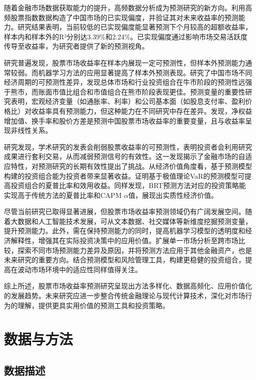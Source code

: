 \documentclass[12pt, a4paper]{article}
\begin{document}
随着金融市场数据获取能力的提升，高频数据分析成为预测研究的新方向。\citet{chen2018}利用高频股票指数数据构造了中国市场的已实现偏度，并验证其对未来收益率的预测能力。研究结果表明，当前较低的已实现偏度能显著预测下个月较高的超额收益率，样本内和样本外的R²分别达3.39\%和2.24\%。已实现偏度通过影响市场交易活跃度传导至收益率，为研究者提供了新的预测视角。

研究普遍发现，股票市场收益率在样本内展现一定可预测性，但样本外预测能力通常较弱。而机器学习方法的应用显著提高了样本外预测表现。\citet{jiang2019}研究了中国市场不同经济周期的可预测性差异，发现总体市场和行业投资组合在牛市阶段的预测性远强于熊市，而账面市值比组合和市值组合在熊市阶段表现更佳。预测变量的重要性研究表明，宏观经济变量（如通胀率、利率）和公司基本面（如股息支付率、盈利价格比）对收益率具有预测能力，但这种能力在不同研究中存在差异。\citet{li2023}发现，净权益增加值、换手率和股价方差是预测中国股票市场收益率的重要变量，且与收益率呈现非线性关系。

\citet{mclean2016}研究发现，学术研究的发表会削弱股票收益率的可预测性，表明投资者会利用研究成果进行套利交易，从而减弱预测信号的有效性。这一发现揭示了金融市场的自适应特性，对预测研究的长期有效性提出了挑战。从经济价值角度看，基于预测模型构建的投资组合能为投资者带来显著收益。\citet{chen2014}证明基于极值理论VaR的预测模型可提高投资组合的夏普比率和效用收益。\citet{li2023}同样发现，BRT预测方法对应的投资策略能实现高于传统方法的夏普比率和CAPM $\alpha $值，展现出实质性经济价值。

尽管当前研究已取得显著进展，但股票市场收益率预测领域仍有广阔发展空间。随着大数据和人工智能技术发展，可从文本数据、社交媒体等新维度挖掘预测变量，提升预测能力。此外，需在保持预测能力的同时，提高机器学习模型的透明度和经济解释性，增强其在实际投资决策中的应用价值。扩展单一市场分析至跨市场比较，探索不同市场预测能力差异及原因，并将预测方法应用于其他金融资产，也是未来研究的重要方向。结合预测模型和风险管理工具，构建更稳健的投资组合，提高在波动市场环境中的适应性同样值得关注。

综上所述，股票市场收益率预测研究呈现出方法多样化、数据高频化、应用价值化的发展趋势。未来研究应进一步整合传统金融理论与现代计算技术，深化对市场行为的理解，提供更具实用价值的预测工具和投资策略。

\section{数据与方法}

\subsection{数据描述}
\end{document}
